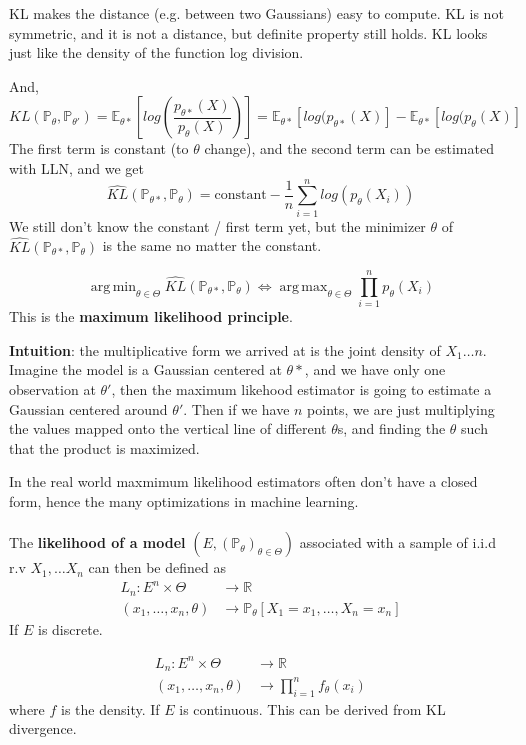 \documentclass{article}
\DeclareMathOperator*{\argmax}{arg\,max}
\DeclareMathOperator*{\argmin}{arg\,min}
\begin{document}
KL makes the distance (e.g. between two Gaussians) easy to compute. KL is not symmetric, and it is not a distance, but definite property still holds.
KL looks just like the density of the function log division.

And,
$$
KL(\mathbb{P}_{\theta}, \mathbb{P}_{\theta'}) = \mathbb{E}_{\theta*}[log(\frac{p_{\theta*}(X)}{p_{\theta}(X)})] = \mathbb{E}_{\theta*}[log(p_{\theta*}(X)] - \mathbb{E}_{\theta*}[log(p_{\theta}(X)]
$$
The first term is constant (to $\theta$ change), and the second term can be estimated with LLN, and we get
$$
\hat{KL}(\mathbb{P}_{\theta*}, \mathbb{P}_{\theta}) = \text{constant} - \frac{1}{n} \sum_{i=1}^{n}{log(p_{\theta}(X_i))}
$$
We still don't know the constant / first term yet, but the minimizer $\theta$ of $\hat{KL}(\mathbb{P}_{\theta*}, \mathbb{P}_{\theta})$ is the same no matter the constant.

$$
\argmin_{\theta \in \Theta} \hat{KL}(\mathbb{P}_{\theta*}, \mathbb{P}_{\theta}) \iff \argmax_{\theta \in \Theta} \prod_{i = 1}^{n} p_{\theta}(X_i)
$$
This is the \textbf{maximum likelihood principle}.

\textbf{Intuition}: the multiplicative form we arrived at is the joint density of $X_1 \dots n$. Imagine the model is a Gaussian centered at $\theta*$, and we have only one observation at $\theta'$, then the maximum likehood estimator is going to estimate a Gaussian centered around $\theta'$.
Then if we have $n$ points, we are just multiplying the values mapped onto the vertical line of different $\theta$s, and finding the $\theta$ such that the product is maximized.

In the real world maxmimum likelihood estimators often don't have a closed form, hence the many optimizations in machine learning.
\\
\\
The \textbf{likelihood of a model} $(E, (\mathbb{P}_{\theta})_{\theta \in \Theta})$ associated with a sample of i.i.d r.v $X_1, \dots X_n$ can then be defined as
\begin{align*}
L_n : E^n \times \Theta & \to \mathbb{R} \\
(x_1, \dots, x_n, \theta) & \to \mathbb{P}_{\theta}[X_1 = x_1, \dots, X_n = x_n]
\end{align*}
If $E$ is discrete.

\begin{align*}
  L_n : E^n \times \Theta & \to \mathbb{R} \\
  (x_1, \dots, x_n, \theta) & \to \prod_{i=1}^{n} f_{\theta}(x_i)
\end{align*}
where $f$ is the density. If $E$ is continuous.
This can be derived from KL divergence.
\end{document}
